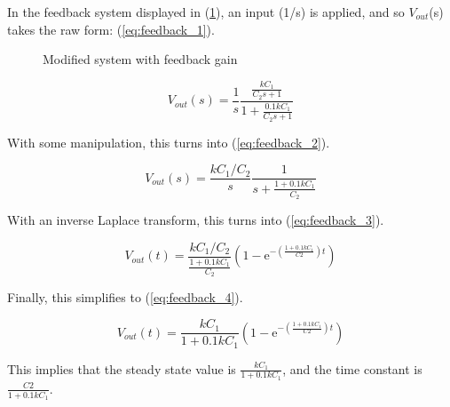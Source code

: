 In the feedback system displayed in (\ref{fig:fig_2}), an input (1/s) is applied, and so $V_{out}$(s) takes the raw form: (\ref{eq:feedback_1}).

\begin{figure}[h!]
	\centering
	\caption{Modified system with feedback gain}
	\label{fig:fig_2}
\end{figure}

\begin{equation}
	\label{eq:feedback_1}
	V_{out}(s) = \frac{1}{s}\frac{\frac{k C_{1}}{C_{2}s + 1}}{1 +\frac{0.1k C_{1}}{C_{2} s + 1}}
\end{equation}

With some manipulation, this turns into (\ref{eq:feedback_2}).

\begin{equation}
    \label{eq:feedback_2}
    V_{out}(s) = \frac{k C_{1}/C_{2}}{s}\frac{1}{s+\frac{1+0.1k C_{1}}{C_{2}}}
\end{equation}

With an inverse Laplace transform, this turns into (\ref{eq:feedback_3}).

\begin{equation}
    \label{eq:feedback_3}
    V_{out}(t) = \frac{k C_{1}/C_{2}}{\frac{1+0.1k C_{1}}{C_{2}}}(1-\mathrm{e}^{-(\frac{1+0.1 k C_{1}}{C2})t})
\end{equation}

Finally, this simplifies to (\ref{eq:feedback_4}).

\begin{equation}
    \label{eq:feedback_4}
    V_{out}(t) = \frac{k C_{1}}{1+0.1k C_{1}}(1-\mathrm{e}^{-(\frac{1+0.1 k C_{1}}{C2})t})
\end{equation}

This implies that the steady state value is $\frac{k C_{1}}{1+0.1k C_{1}}$, and the time constant is $\frac{C2}{1+0.1 k C_{1}}$.

